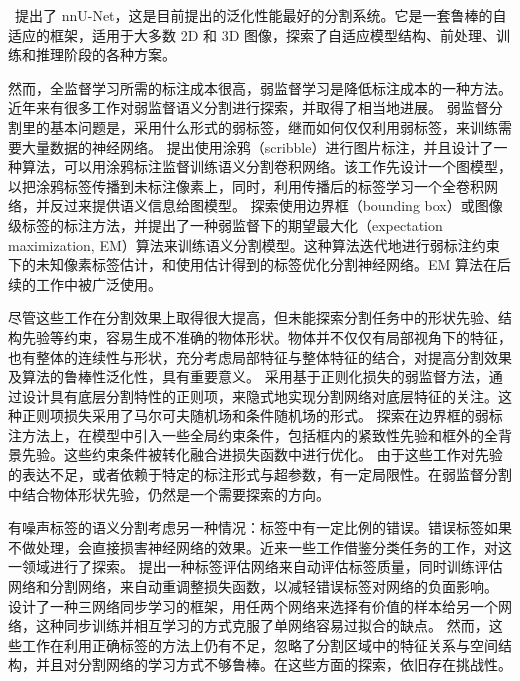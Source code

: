 \citet{isensee2019automated}~提出了 nnU-Net，这是目前提出的泛化性能最好的分割系统。它是一套鲁棒的自适应的框架，适用于大多数 2D 和 3D 图像，探索了自适应模型结构、前处理、训练和推理阶段的各种方案。

然而，全监督学习所需的标注成本很高，弱监督学习是降低标注成本的一种方法。近年来有很多工作对弱监督语义分割进行探索，并取得了相当地进展。
弱监督分割里的基本问题是，采用什么形式的弱标签，继而如何仅仅利用弱标签，来训练需要大量数据的神经网络。
\citet{lin2016scribblesup} 提出使用涂鸦（scribble）进行图片标注，并且设计了一种算法，可以用涂鸦标注监督训练语义分割卷积网络。该工作先设计一个图模型，以把涂鸦标签传播到未标注像素上，同时，利用传播后的标签学习一个全卷积网络，并反过来提供语义信息给图模型。
\citet{papandreou2015weakly} 探索使用边界框（bounding box）或图像级标签的标注方法，并提出了一种弱监督下的期望最大化（expectation maximization, EM）算法来训练语义分割模型。这种算法迭代地进行弱标注约束下的未知像素标签估计，和使用估计得到的标签优化分割神经网络。EM 算法在后续的工作中被广泛使用。

尽管这些工作在分割效果上取得很大提高，但未能探索分割任务中的形状先验、结构先验等约束，容易生成不准确的物体形状。物体并不仅仅有局部视角下的特征，也有整体的连续性与形状，充分考虑局部特征与整体特征的结合，对提高分割效果及算法的鲁棒性泛化性，具有重要意义。
\citet{tang2018regularized} 采用基于正则化损失的弱监督方法，通过设计具有底层分割特性的正则项，来隐式地实现分割网络对底层特征的关注。这种正则项损失采用了马尔可夫随机场和条件随机场的形式。
\citet{kervadec2020bounding} 探索在边界框的弱标注方法上，在模型中引入一些全局约束条件，包括框内的紧致性先验和框外的全背景先验。这些约束条件被转化融合进损失函数中进行优化。
由于这些工作对先验的表达不足，或者依赖于特定的标注形式与超参数，有一定局限性。在弱监督分割中结合物体形状先验，仍然是一个需要探索的方向。

有噪声标签的语义分割考虑另一种情况：标签中有一定比例的错误。错误标签如果不做处理，会直接损害神经网络的效果。近来一些工作借鉴分类任务的工作，对这一领域进行了探索。
\citet{Zhu2019PickandLearnAQ} 提出一种标签评估网络来自动评估标签质量，同时训练评估网络和分割网络，来自动重调整损失函数，以减轻错误标签对网络的负面影响。
\citet{Zhang2020RobustMI} 设计了一种三网络同步学习的框架，用任两个网络来选择有价值的样本给另一个网络，这种同步训练并相互学习的方式克服了单网络容易过拟合的缺点。
然而，这些工作在利用正确标签的方法上仍有不足，忽略了分割区域中的特征关系与空间结构，并且对分割网络的学习方式不够鲁棒。在这些方面的探索，依旧存在挑战性。

